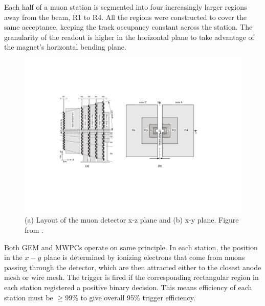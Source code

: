 
Each half of a muon station is segmented into four increasingly larger regions away from the beam, R1 to R4.
 All the regions were constructed to cover the same acceptance, keeping the track occupancy constant across the station. The granularity of the readout is higher in the horizontal plane to take advantage of the magnet's horizontal bending plane.




\begin{figure}[!h]
	\centering
	\includegraphics[width = 1.0\textwidth]{figs/detector/sideview.pdf}%
	\caption{(a) Layout of the muon detector x-z plane and (b) x-y plane. Figure from \cite{LHCb-DP-2012-002}. }  
	\label{fig:MuonGran}
\end{figure}

Both GEM and \Gls{MWPCs} operate on \DIFdelbegin {}\DIFdelend \DIFaddbegin {}\DIFaddend same principle. In each station, the position in the $x-y$ plane is determined by ionizing electrons that come from muons passing through the detector, which are then attracted either to the closest anode mesh or wire mesh. The trigger is fired if the corresponding rectangular region in each station registered a positive binary decision. This means \DIFdelbegin {}\DIFdelend \DIFaddbegin {}\DIFaddend efficiency of each station must be $\geq$99\% to give \DIFaddbegin {}\DIFaddend overall 95\% trigger efficiency. %



